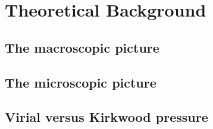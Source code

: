 \chapter{Theoretical Background}

\section{The macroscopic picture}

\section{The microscopic picture}

\section{Virial versus Kirkwood pressure}



